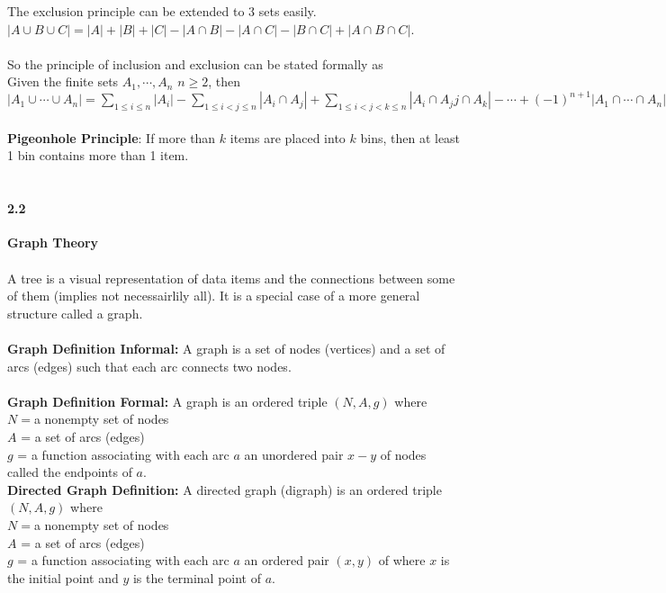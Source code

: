 \documentclass[14pt]{extreport}
\begin{document}
The exclusion principle can be extended to 3 sets easily. $|A \cup B \cup C| = |A| + |B| + |C| - |A \cap B| - |A \cap C| -|B \cap C| + |A \cap B \cap C|$.\\\\

So the principle of  inclusion and exclusion can be stated formally as\\
Given the finite sets $A_1, \cdots, A_n$ $n \ge 2$, then\\
$|A_1 \cup \cdots \cup A_n| = \sum_{1 \le i \le n} |A_i| - \sum_{1 \le i < j \le n} |A_i \cap A_j| + \sum_{1 \le i < j < k \le n} | A_i \cap A_jj \cap A_k| - \cdots + (-1)^{n+1} |A_1 \cap \cdots \cap A_n|$\\\\

\textbf{Pigeonhole Principle}: If more than $k$ items are placed into $k$ bins, then at least 1 bin contains more than 1 item.\\\\

\paragraph{2.2} \textbf{Graph Theory}\\
\\
A tree is a visual representation of data items and the connections between some of them (implies not necessairlily all). It is a special case of a more general structure called
a graph.\\
\\
\textbf{Graph Definition Informal:} A graph is a set of nodes (vertices) and a set of arcs (edges) such that each arc connects two nodes.\\
\\
\textbf{Graph Definition Formal:} A graph is an ordered triple $(N, A, g)$ where\\
$N = $a nonempty set of nodes\\
$A$ = a set of arcs (edges)\\
$g$ = a function associating with each arc $a$ an unordered pair $x-y$ of nodes called the endpoints of $a$.\\


\textbf{Directed Graph Definition:} A directed graph (digraph) is an ordered triple $(N,A,g)$ where\\
$N = $a nonempty set of nodes\\
$A$ = a set of arcs (edges)\\
$g$ = a function associating with each arc $a$ an ordered pair $(x,y)$ of where $x$ is the initial point and $y$ is the terminal point of $a$.\\
\end{document}

